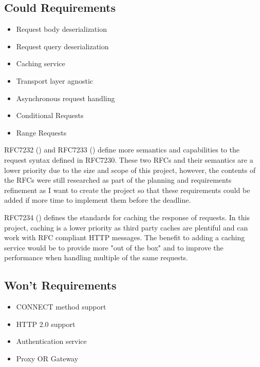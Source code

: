 \documentclass[12pt, a4paper]{article}
\begin{document}
\subsection{Could Requirements}

\begin{itemize}
    \item\label{creq:request-body-deserialization} Request body deserialization
    \item\label{creq:request-query-deserialization} Request query deserialization
    \item\label{creq:caching-service} Caching service
    \item\label{creq:transport-layer-agnostic} Transport layer agnostic
    \item\label{creq:asynchronous-request-handling} Asynchronous request handling
    \item\label{creq:conditional-requests} Conditional Requests
    \item\label{creq:range-requests} Range Requests
\end{itemize}

RFC7232 (\cite{rfc7232}) and RFC7233 (\cite{rfc7233}) define more semantics and capabilities to the
request syntax defined in RFC7230. These two RFCs and their semantics are a lower priority due to the
size and scope of this project, however, the contents of the RFCs were still researched as part of
the planning and requirements refinement as I want to create the project so that these requirements
could be added if more time to implement them before the deadline.

RFC7234 (\cite{rfc7234}) defines the standards for caching the response of requests. In this project,
caching is a lower priority as third party caches are plentiful and can work with RFC compliant
HTTP messages. The benefit to adding a caching service would be to provide more "out of the box"
and to improve the performance when handling multiple of the same requests.

\subsection{Won't Requirements}

\begin{itemize}
    \item\label{wreq:connect-method-support} CONNECT method support
    \item\label{wreq:http2.0-support} HTTP 2.0 support
    \item\label{wreq:authentication} Authentication service
    \item\label{wreq:proxy-or-gateway} Proxy OR Gateway
\end{itemize}
\end{document}
